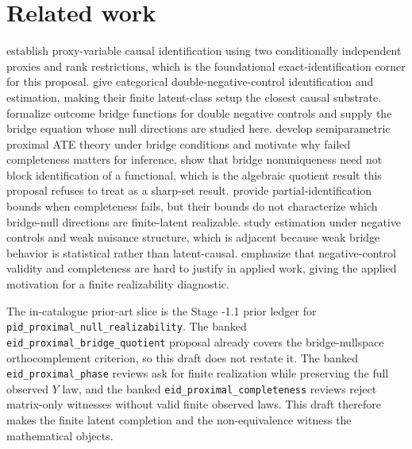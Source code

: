 \documentclass[11pt]{article}
\theoremstyle{definition}
\theoremstyle{plain}
\theoremstyle{remark}
\begin{document}
\section{Related work}
\citet{miao2018proxyVariables} establish proxy-variable causal identification using two conditionally independent proxies and rank restrictions, which is the foundational exact-identification corner for this proposal. \citet{shi2020multiplyRobustDNC} give categorical double-negative-control identification and estimation, making their finite latent-class setup the closest causal substrate. \citet{miao2024confoundingBridge} formalize outcome bridge functions for double negative controls and supply the bridge equation whose null directions are studied here. \citet{cui2024semiparametricProximal} develop semiparametric proximal ATE theory under bridge conditions and motivate why failed completeness matters for inference. \citet{zhang2023proximalNonunique} show that bridge nonuniqueness need not block identification of a functional, which is the algebraic quotient result this proposal refuses to treat as a sharp-set result. \citet{ghassami2024partialProxy} provide partial-identification bounds when completeness fails, but their bounds do not characterize which bridge-null directions are finite-latent realizable. \citet{kallus2022minimaxNegativeControls} study estimation under negative controls and weak nuisance structure, which is adjacent because weak bridge behavior is statistical rather than latent-causal. \citet{zivich2023introducingPCI} emphasize that negative-control validity and completeness are hard to justify in applied work, giving the applied motivation for a finite realizability diagnostic.

The in-catalogue prior-art slice is the Stage -1.1 prior ledger for \texttt{pid\_proximal\_null\_realizability}. The banked \texttt{eid\_proximal\_bridge\_quotient} proposal already covers the bridge-nullspace orthocomplement criterion, so this draft does not restate it. The banked \texttt{eid\_proximal\_phase} reviews ask for finite realization while preserving the full observed \(Y\) law, and the banked \texttt{eid\_proximal\_completeness} reviews reject matrix-only witnesses without valid finite observed laws. This draft therefore makes the finite latent completion and the non-equivalence witness the mathematical objects.
\end{document}
